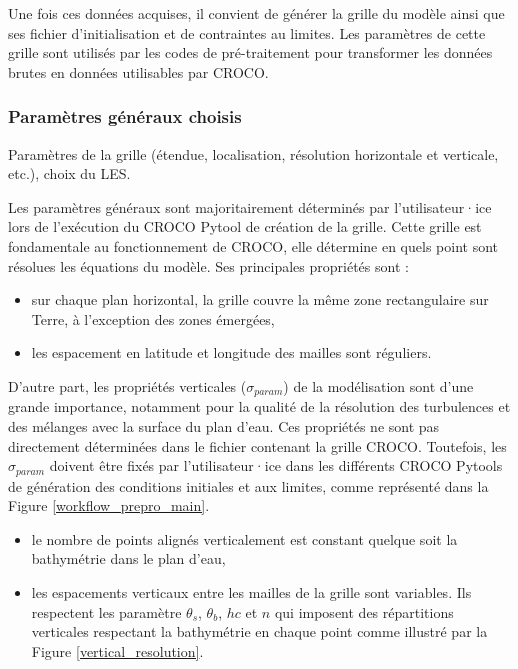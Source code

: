 \documentclass[10pt,a4paper,titlepage]{article}
\begin{document}
Une fois ces données acquises, il convient de générer la grille du modèle ainsi que ses fichier d'initialisation et de contraintes au limites.
Les paramètres de cette grille sont utilisés par les codes de pré-traitement pour transformer les données brutes en données utilisables par CROCO.

\subsubsection{Paramètres généraux choisis}
{\color{lightgrey}
    Paramètres de la grille (étendue, localisation, résolution horizontale et verticale, etc.), choix du LES.
}

Les paramètres généraux sont majoritairement déterminés par l'utilisateur·ice lors de l'exécution du CROCO Pytool de création de la grille.
Cette grille est fondamentale au fonctionnement de CROCO, elle détermine en quels point sont résolues les équations du modèle. Ses principales propriétés sont :

\begin{itemize}
    \item sur chaque plan horizontal, la grille couvre la même zone rectangulaire sur Terre, à l'exception des zones émergées,
    \item les espacement en latitude et longitude des mailles sont réguliers.
\end{itemize}

D'autre part, les propriétés verticales ($\sigma_{param}$) de la modélisation sont d'une grande importance, notamment pour la qualité de la résolution des turbulences et des mélanges avec la surface du plan d'eau.
Ces propriétés ne sont pas directement déterminées dans le fichier contenant la grille CROCO.
Toutefois, les $\sigma_{param}$ doivent être fixés par l'utilisateur·ice dans les différents CROCO Pytools de génération des conditions initiales et aux limites, comme représenté dans la Figure \ref{workflow_prepro_main}.

\begin{itemize}
    \item le nombre de points alignés verticalement est constant quelque soit la bathymétrie dans le plan d'eau,
    \item les espacements verticaux entre les mailles de la grille sont variables. Ils respectent les paramètre $\theta_s$, $\theta_b$, $hc$ et $n$ qui imposent des répartitions verticales respectant la bathymétrie en chaque point comme illustré par la Figure \ref{vertical_resolution}.
\end{itemize}
\end{document}
